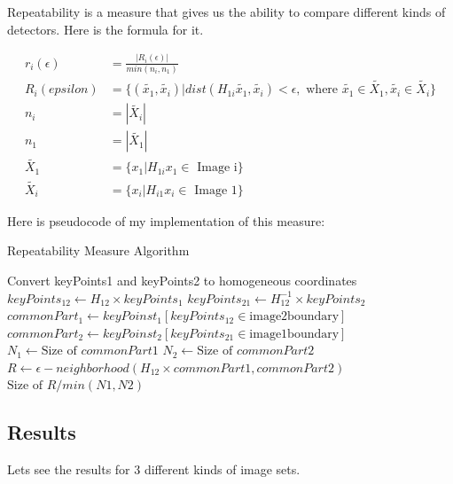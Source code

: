 \documentclass[12pt]{article}
\begin{document}
Repeatability is a measure that gives us the ability to compare different kinds of detectors. Here is the formula for it.

\begin{align*}
    r_i(\epsilon) & = \frac{\left| R_i(\epsilon) \right|}{min(n_i, n_1)} \\
    R_i(epsilon) & = \{\left( \tilde{x_1}, \tilde{x_i} \right) | dist(H_{1i}\tilde{x_1}, \tilde{x_i}) < \epsilon, \text{ where } \tilde{x_1} \in \tilde{X_1}, \tilde{x_i} \in \tilde{X_i} \} \\
    n_i & = \left| \tilde{X_i} \right| \\
    n_1 & = \left| \tilde{X_1} \right| \\
    \tilde{X_1} & = \{x_1 | H_{1i}x_1 \in \text{ Image i}\} \\
    \tilde{X_i} & = \{x_i | H_{i1}x_i \in \text{ Image 1}\}
\end{align*}
    
Here is pseudocode of my implementation of this measure:
\begin{algorithm}
\caption{Repeatability Measure Algorithm}\label{repeatability}
\begin{algorithmic}[1]
\State Convert keyPoints1 and keyPoints2 to homogeneous coordinates
\State $keyPoints_{12} \gets H_{12} \times keyPoints_1$
\State $keyPoints_{21} \gets H_{12}^{-1} \times keyPoints_2$
\State $commonPart_1 \gets keyPoinst_1[keyPoints_{12} \in \text{image2boundary}]$
\State $commonPart_2 \gets keyPoinst_2[keyPoints_{21} \in \text{image1boundary}]$
\State $N_1 \gets \text{Size of } commonPart1$
\State $N_2 \gets \text{Size of } commonPart2$
\State $R \gets \epsilon-neighborhood(H_{12} \times commonPart1, commonPart2)$
\State \Return $\text{Size of } R / min(N1, N2)$
\EndProcedure
\end{algorithmic}
\end{algorithm}

\subsection{Results}
Lets see the results for 3 different kinds of image sets.
\end{document}
